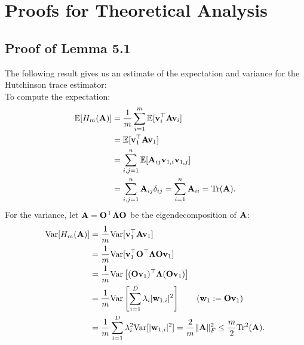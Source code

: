 \onecolumn
{}


\vspace{-5mm}
\setcounter{section}{0}
\section{Proofs for Theoretical Analysis}\label{sec:appendix_trace_estimate}
\subsection{Proof of Lemma 5.1}
The following result gives us an estimate of the expectation and variance for the Hutchinson trace estimator:\\
To compute the expectation:
\begin{align*}
  \mathbb{E}[H_m({\bf A})] &= \frac{1}{m}\sum_{i=1}^{m}\mathbb{E}[\mathbf{v}_i^\top{\bf A}\mathbf{v}_i] \\
  &= \mathbb{E}[\mathbf{v}_1^\top {\bf A} \mathbf{v}_1] \\
  &= \sum_{i,j=1}^{n}\mathbb{E}[{\bf A}_{ij}\mathbf{v}_{1,i}\mathbf{v}_{1,j}] \\
  &= \sum_{i, j=1}^{n}{\bf A}_{ij}\delta_{ij} = \sum_{i=1}^{n}{\bf A}_{ii} = \mathrm{Tr}({\bf A}).
\end{align*}
For the variance, let ${\bf A}={\bf O}^\top{\bf \Lambda}{\bf O}$ be the eigendecomposition of ${\bf A}$:
\begin{align*}
  \mathrm{Var}[H_m({\bf A})] &= \frac{1}{m}\mathrm{Var}[\mathbf{v}_1^\top {\bf A} \mathbf{v}_1] \\
  &= \frac{1}{m}\mathrm{Var}[\mathbf{v}_1^\top{\bf O}^\top {\bf \Lambda} {\bf O} \mathbf{v}_1] \\
  &= \frac{1}{m}\mathrm{Var}\left[ ({\bf O}\mathbf{v}_1)^\top {\bf \Lambda} ({\bf O}\mathbf{v}_1) \right] \\
  &= \frac{1}{m}\mathrm{Var}\left[ \sum_{i=1}^{D}\lambda_i |\mathbf{w}_{1,i}|^2 \right] \qquad (\text{$\mathbf{w}_1:={\bf O}\mathbf{v}_1$})\\
  &= \frac{1}{m}\sum_{i=1}^{D}\lambda_i^2 \mathrm{Var}[|\mathbf{w}_{1, i}|^2] = \frac{2}{m}\|{\bf A}\|_F^2\le \frac{m}{2}\mathrm{Tr}^2({\bf A}).
\end{align*}

